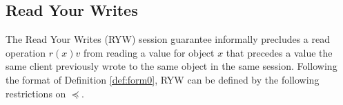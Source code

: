 \documentclass[journal,compsoc]{IEEEtran}
\begin{document}
\subsection{Read Your Writes}

The Read Your Writes (RYW) session guarantee informally precludes a read operation $r(x)v$  from reading a value for object $x$ that precedes a value the same client previously wrote to the same object in the same session.
Following the format of Definition \ref{def:form0}, RYW can be defined by the following restrictions on $\preccurlyeq$.
\end{document}
